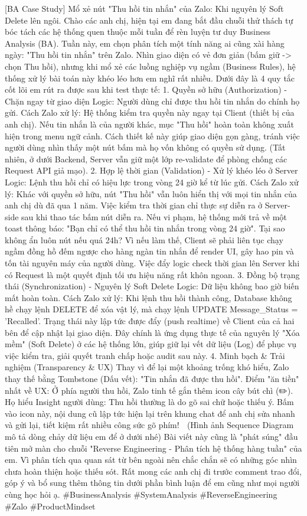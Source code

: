 [BA Case Study] Mổ xẻ nút "Thu hồi tin nhắn" của Zalo: Khi nguyên lý Soft Delete lên ngôi.
Chào các anh chị, hiện tại em đang bắt đầu chuỗi thử thách tự bóc tách các hệ thống quen thuộc mỗi tuần để rèn luyện tư duy Business Analysis (BA). Tuần này, em chọn phân tích một tính năng ai cũng xài hàng ngày: "Thu hồi tin nhắn" trên Zalo.
Nhìn giao diện có vẻ đơn giản (bấm giữ -> chọn Thu hồi), nhưng khi mổ xẻ các luồng nghiệp vụ ngầm (Business Rules), hệ thống xử lý bài toán này khéo léo hơn em nghĩ rất nhiều. Dưới đây là 4 quy tắc cốt lõi em rút ra được sau khi test thực tế:
1. Quyền sở hữu (Authorization) - Chặn ngay từ giao diện
Logic: Người dùng chỉ được thu hồi tin nhắn do chính họ gửi.
Cách Zalo xử lý: Hệ thống kiểm tra quyền này ngay tại Client (thiết bị của anh chị). Nếu tin nhắn là của người khác, mục "Thu hồi" hoàn toàn không xuất hiện trong menu ngữ cảnh. Cách thiết kế này giúp giao diện gọn gàng, tránh việc người dùng nhìn thấy một nút bấm mà họ vốn không có quyền sử dụng. (Tất nhiên, ở dưới Backend, Server vẫn giữ một lớp re-validate để phòng chống các Request API giả mạo).
2. Hợp lệ thời gian (Validation) - Xử lý khéo léo ở Server
Logic: Lệnh thu hồi chỉ có hiệu lực trong vòng 24 giờ kể từ lúc gửi.
Cách Zalo xử lý: Khác với quyền sở hữu, nút "Thu hồi" vẫn luôn hiển thị với mọi tin nhắn của anh chị dù đã qua 1 năm. Việc kiểm tra thời gian chỉ thực sự diễn ra ở Server-side sau khi thao tác bấm nút diễn ra. Nếu vi phạm, hệ thống mới trả về một toast thông báo: "Bạn chỉ có thể thu hồi tin nhắn trong vòng 24 giờ".
Tại sao không ẩn luôn nút nếu quá 24h? Vì nếu làm thế, Client sẽ phải liên tục chạy ngầm đồng hồ đếm ngược cho hàng ngàn tin nhắn để render UI, gây hao pin và tốn tài nguyên máy của người dùng. Việc đẩy logic check thời gian lên Server khi có Request là một quyết định tối ưu hiệu năng rất khôn ngoan.
3. Đồng bộ trạng thái (Synchronization) - Nguyên lý Soft Delete
Logic: Dữ liệu không bao giờ biến mất hoàn toàn.
Cách Zalo xử lý: Khi lệnh thu hồi thành công, Database không hề chạy lệnh DELETE để xóa vật lý, mà chạy lệnh UPDATE Message_Status = 'Recalled'. Trạng thái này lập tức được đẩy (push realtime) về Client của cả hai bên để cập nhật lại giao diện. Đây chính là ứng dụng thực tế của nguyên lý "Xóa mềm" (Soft Delete) ở các hệ thống lớn, giúp giữ lại vết dữ liệu (Log) để phục vụ việc kiểm tra, giải quyết tranh chấp hoặc audit sau này.
4. Minh bạch & Trải nghiệm (Transparency & UX)
Thay vì để lại một khoảng trống khó hiểu, Zalo thay thế bằng Tombstone (Dấu vết): "Tin nhắn đã được thu hồi".
Điểm "ăn tiền" nhất về UX: Ở phía người thu hồi, Zalo tinh tế gắn thêm icon cây bút chì (✏️). Họ hiểu Insight người dùng: Thu hồi thường là do gõ sai chữ hoặc thiếu ý. Bấm vào icon này, nội dung cũ lập tức hiện lại trên khung chat để anh chị sửa nhanh và gửi lại, tiết kiệm rất nhiều công sức gõ phím!
📌 (Hình ảnh Sequence Diagram mô tả dòng chảy dữ liệu em để ở dưới nhé)
Bài viết này cũng là "phát súng" đầu tiên mở màn cho chuỗi "Reverse Engineering - Phân tích hệ thống hàng tuần" của em. Vì phân tích qua quan sát từ bên ngoài nên chắc chắn sẽ có những góc nhìn chưa hoàn thiện hoặc thiếu sót. Rất mong các anh chị đi trước comment trao đổi, góp ý và bổ sung thêm thông tin dưới phần bình luận để em cũng như mọi người cùng học hỏi ạ.
#BusinessAnalysis #SystemAnalysis #ReverseEngineering #Zalo #ProductMindset